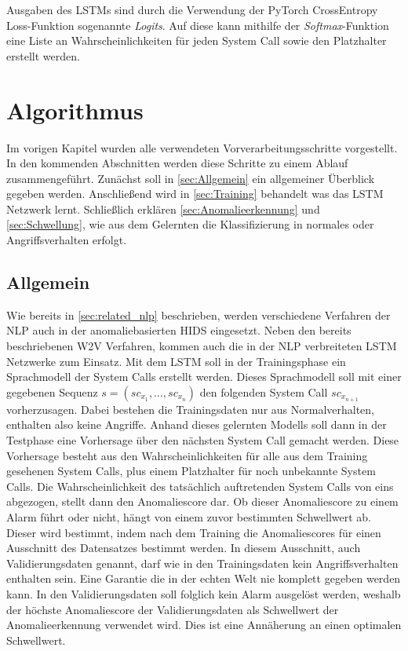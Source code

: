         Ausgaben des \acp{LSTM} sind durch die Verwendung der PyTorch CrossEntropy Loss-Funktion sogenannte \textit{Logits}.
        Auf diese kann mithilfe der \textit{Softmax}-Funktion eine Liste an Wahrscheinlichkeiten für jeden System Call sowie den Platzhalter erstellt werden.

    \section{Algorithmus}\label{sec:Algorithmus}
        Im vorigen Kapitel wurden alle verwendeten Vorverarbeitungsschritte vorgestellt.
        In den kommenden Abschnitten werden diese Schritte zu einem Ablauf zusammengeführt.
        Zunächst soll in \autoref{sec:Allgemein} ein allgemeiner Überblick gegeben werden.
        Anschließend wird in \autoref{sec:Training} behandelt was das \ac{LSTM} Netzwerk lernt.
        Schließlich erklären \autoref{sec:Anomalieerkennung} und \autoref{sec:Schwellung}, wie aus dem Gelernten die Klassifizierung in normales oder Angriffsverhalten erfolgt.

        \subsection{Allgemein}\label{sec:Allgemein}
            Wie bereits in \autoref{sec:related_nlp} beschrieben, werden verschiedene Verfahren der \ac{NLP} auch in der anomaliebasierten \ac{HIDS} eingesetzt.
            Neben den bereits beschriebenen \ac{W2V} Verfahren, kommen auch die in der \ac{NLP} verbreiteten \ac{LSTM} Netzwerke zum Einsatz.
            Mit dem \ac{LSTM} soll in der Trainingsphase ein Sprachmodell der System Calls erstellt werden.
            Dieses Sprachmodell soll mit einer gegebenen Sequenz $s = (sc_{x_1},\dots,sc_{x_n})$ den folgenden System Call $sc_{x_{n+1}}$ vorherzusagen. 
            Dabei bestehen die Trainingsdaten nur aus Normalverhalten, enthalten also keine Angriffe.
            Anhand dieses gelernten Modells soll dann in der Testphase eine Vorhersage über den nächsten System Call gemacht werden.
            Diese Vorhersage besteht aus den Wahrscheinlichkeiten für alle aus dem Training gesehenen System Calls, plus einem Platzhalter für noch unbekannte System Calls.
            Die Wahrscheinlichkeit des tatsächlich auftretenden System Calls von eins abgezogen, stellt dann den Anomaliescore dar.
            Ob dieser Anomaliescore zu einem Alarm führt oder nicht, hängt von einem zuvor bestimmten Schwellwert ab.
            Dieser wird bestimmt, indem nach dem Training die Anomaliescores für einen Ausschnitt des Datensatzes bestimmt werden.
            In diesem Ausschnitt, auch Validierungsdaten genannt, darf wie in den Trainingsdaten kein Angriffsverhalten enthalten sein.
            Eine Garantie die in der echten Welt nie komplett gegeben werden kann.
            In den Validierungsdaten soll folglich kein Alarm ausgelöst werden, weshalb der höchste Anomaliescore der Validierungsdaten als Schwellwert der Anomalieerkennung verwendet wird.
            Dies ist eine Annäherung an einen optimalen Schwellwert.

